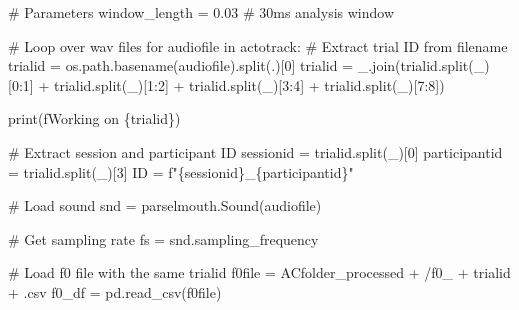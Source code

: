 \documentclass[
  letterpaper,
  DIV=11,
  numbers=noendperiod]{scrreprt}
\newenvironment{Shaded}{\begin{snugshade}}{\end{snugshade}}
\newcommand{\BuiltInTok}[1]{\textcolor[rgb]{0.00,0.23,0.31}{#1}}
\newcommand{\CommentTok}[1]{\textcolor[rgb]{0.37,0.37,0.37}{#1}}
\newcommand{\ControlFlowTok}[1]{\textcolor[rgb]{0.00,0.23,0.31}{#1}}
\newcommand{\DecValTok}[1]{\textcolor[rgb]{0.68,0.00,0.00}{#1}}
\newcommand{\FloatTok}[1]{\textcolor[rgb]{0.68,0.00,0.00}{#1}}
\newcommand{\KeywordTok}[1]{\textcolor[rgb]{0.00,0.23,0.31}{#1}}
\newcommand{\NormalTok}[1]{\textcolor[rgb]{0.00,0.23,0.31}{#1}}
\newcommand{\OperatorTok}[1]{\textcolor[rgb]{0.37,0.37,0.37}{#1}}
\newcommand{\SpecialCharTok}[1]{\textcolor[rgb]{0.37,0.37,0.37}{#1}}
\newcommand{\SpecialStringTok}[1]{\textcolor[rgb]{0.13,0.47,0.30}{#1}}
\newcommand{\StringTok}[1]{\textcolor[rgb]{0.13,0.47,0.30}{#1}}
\begin{document}
\begin{Shaded}
\begin{Highlighting}[]
\CommentTok{\# Parameters}
\NormalTok{window\_length }\OperatorTok{=} \FloatTok{0.03} \CommentTok{\# 30ms analysis window}

\CommentTok{\# Loop over wav files}
\ControlFlowTok{for}\NormalTok{ audiofile }\KeywordTok{in}\NormalTok{ actotrack:}
    \CommentTok{\# Extract trial ID from filename}
\NormalTok{    trialid }\OperatorTok{=}\NormalTok{ os.path.basename(audiofile).split(}\StringTok{\textquotesingle{}.\textquotesingle{}}\NormalTok{)[}\DecValTok{0}\NormalTok{]}
\NormalTok{    trialid }\OperatorTok{=} \StringTok{\textquotesingle{}\_\textquotesingle{}}\NormalTok{.join(trialid.split(}\StringTok{\textquotesingle{}\_\textquotesingle{}}\NormalTok{)[}\DecValTok{0}\NormalTok{:}\DecValTok{1}\NormalTok{] }\OperatorTok{+}\NormalTok{ trialid.split(}\StringTok{\textquotesingle{}\_\textquotesingle{}}\NormalTok{)[}\DecValTok{1}\NormalTok{:}\DecValTok{2}\NormalTok{] }\OperatorTok{+}\NormalTok{ trialid.split(}\StringTok{\textquotesingle{}\_\textquotesingle{}}\NormalTok{)[}\DecValTok{3}\NormalTok{:}\DecValTok{4}\NormalTok{] }\OperatorTok{+}\NormalTok{ trialid.split(}\StringTok{\textquotesingle{}\_\textquotesingle{}}\NormalTok{)[}\DecValTok{7}\NormalTok{:}\DecValTok{8}\NormalTok{])}

    \BuiltInTok{print}\NormalTok{(}\SpecialStringTok{f\textquotesingle{}Working on }\SpecialCharTok{\{}\NormalTok{trialid}\SpecialCharTok{\}}\SpecialStringTok{\textquotesingle{}}\NormalTok{)}

    \CommentTok{\# Extract session and participant ID}
\NormalTok{    sessionid }\OperatorTok{=}\NormalTok{ trialid.split(}\StringTok{\textquotesingle{}\_\textquotesingle{}}\NormalTok{)[}\DecValTok{0}\NormalTok{]}
\NormalTok{    participantid }\OperatorTok{=}\NormalTok{ trialid.split(}\StringTok{\textquotesingle{}\_\textquotesingle{}}\NormalTok{)[}\DecValTok{3}\NormalTok{]}
\NormalTok{    ID }\OperatorTok{=} \SpecialStringTok{f"}\SpecialCharTok{\{}\NormalTok{sessionid}\SpecialCharTok{\}}\SpecialStringTok{\_}\SpecialCharTok{\{}\NormalTok{participantid}\SpecialCharTok{\}}\SpecialStringTok{"}

    \CommentTok{\# Load sound}
\NormalTok{    snd }\OperatorTok{=}\NormalTok{ parselmouth.Sound(audiofile)}

    \CommentTok{\# Get sampling rate}
\NormalTok{    fs }\OperatorTok{=}\NormalTok{ snd.sampling\_frequency}

    \CommentTok{\# Load f0 file with the same trialid}
\NormalTok{    f0file }\OperatorTok{=}\NormalTok{ ACfolder\_processed }\OperatorTok{+} \StringTok{\textquotesingle{}/f0\_\textquotesingle{}} \OperatorTok{+}\NormalTok{ trialid }\OperatorTok{+} \StringTok{\textquotesingle{}.csv\textquotesingle{}}
\NormalTok{    f0\_df }\OperatorTok{=}\NormalTok{ pd.read\_csv(f0file)}


\end{Highlighting}
\end{Shaded}
\end{document}
